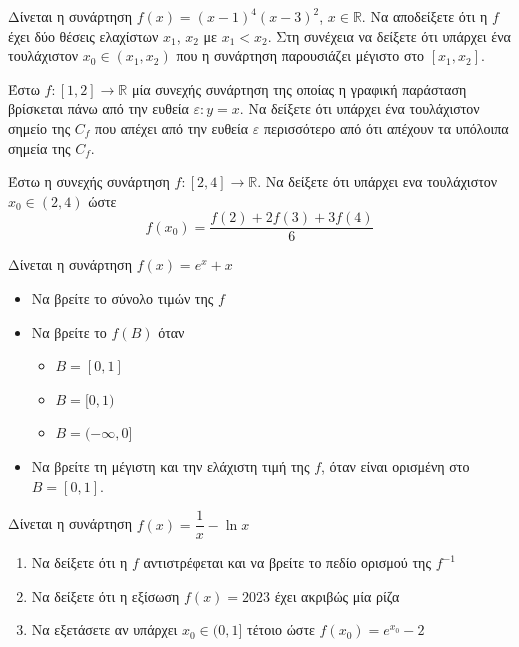 \documentclass{presentation}
\begin{document}
\begin{askisi}
  Δίνεται η συνάρτηση $f(x)=(x-1)^4(x-3)^2$, $x\in \mathbb{R}$. Να αποδείξετε ότι η $f$ έχει δύο θέσεις ελαχίστων $x_1$, $x_2$ με $x_1<x_2$. Στη συνέχεια να δείξετε ότι υπάρχει ένα τουλάχιστον $x_0\in (x_1,x_2)$ που η συνάρτηση παρουσιάζει μέγιστο στο $[x_1,x_2]$.

  \hyperlink{Λύση3}{}
\end{askisi}

\begin{askisi}
  Έστω $f:[1,2]\to\mathbb{R}$ μία συνεχής συνάρτηση της οποίας η γραφική παράσταση βρίσκεται πάνω από την ευθεία $ε:y=x$. Να δείξετε ότι υπάρχει ένα τουλάχιστον σημείο της $C_f$ που απέχει από την ευθεία $ε$ περισσότερο από ότι απέχουν τα υπόλοιπα σημεία της $C_f$.

  \hyperlink{Λύση4}{}
\end{askisi}

\begin{askisi}
  Έστω η συνεχής συνάρτηση $f:[2,4]\to\mathbb{R}$. Να δείξετε ότι υπάρχει ενα τουλάχιστον $x_0\in (2,4)$ ώστε
  $$f(x_0)=\frac{f(2)+2f(3)+3f(4)}{6}$$

  \hyperlink{Λύση5}{}
\end{askisi}

\begin{askisi}
  Δίνεται η συνάρτηση $f(x)=e^x+x$
  \begin{itemize}
    \item<1-> Να βρείτε το σύνολο τιμών της $f$
    \item<2-> Να βρείτε το $f(Β)$ όταν
          \begin{itemize}
            \item<3-> $Β=[0,1]$
            \item<4-> $Β=[0,1)$
            \item<5-> $Β=(-\infty,0]$
          \end{itemize}
    \item<6-> Να βρείτε τη μέγιστη και την ελάχιστη τιμή της $f$, όταν είναι ορισμένη στο $Β=[0,1]$.
  \end{itemize}

  \hyperlink{Λύση6}{}
\end{askisi}

\begin{askisi}
  Δίνεται η συνάρτηση $f(x)=\dfrac{1}{x}-\ln x$
  \begin{enumerate}
    \item<1-> Να δείξετε ότι η $f$ αντιστρέφεται και να βρείτε το πεδίο ορισμού της $f^{-1}$
    \item<2-> Να δείξετε ότι η εξίσωση $f(x)=2023$ έχει ακριβώς μία ρίζα
    \item<3-> Να εξετάσετε αν υπάρχει $x_0\in (0,1]$ τέτοιο ώστε $f(x_0)=e^{x_0}-2$
  \end{enumerate}
\end{askisi}
\end{document}
